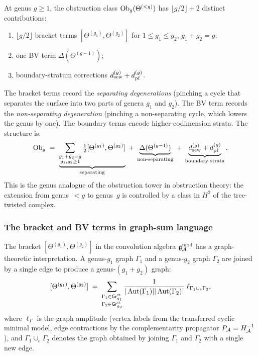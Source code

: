 \begin{remark}
\label{rem:thqg-VII-general-pattern}
At genus $g \geq 1$, the obstruction class
$\mathrm{Ob}_g(\Theta^{(<g)})$ has $\lfloor g/2 \rfloor + 2$ distinct
contributions:
\begin{enumerate}[label=(\alph*)]
\item $\lfloor g/2 \rfloor$ bracket terms
 $[\Theta^{(g_1)},\Theta^{(g_2)}]$ for $1 \leq g_1 \leq g_2$,
 $g_1 + g_2 = g$;
\item one BV term $\Delta(\Theta^{(g-1)})$;
\item boundary-stratum corrections $d_{\mathrm{sew}}^{(g)} + d_{\mathrm{pf}}^{(g)}$.
\end{enumerate}
The bracket terms record the \emph{separating degenerations}
(pinching a cycle that separates the surface into two parts of
genera $g_1$ and $g_2$). The BV term records the
\emph{non-separating degeneration} (pinching a non-separating
cycle, which lowers the genus by one). The boundary terms encode
higher-codimension strata. The structure is:
\begin{equation}\label{eq:thqg-VII-obs-general}
\mathrm{Ob}_g
\;=\;
\underbrace{
\sum_{\substack{g_1+g_2=g \\ g_1,g_2 \geq 1}}
\tfrac{1}{2}[\Theta^{(g_1)},\Theta^{(g_2)}]
}_{\text{separating}}
\;+\;
\underbrace{
\Delta(\Theta^{(g-1)})
}_{\text{non-separating}}
\;+\;
\underbrace{
d_{\mathrm{sew}}^{(g)} + d_{\mathrm{pf}}^{(g)}
}_{\text{boundary strata}}.
\end{equation}
This is the genus analogue of the obstruction tower in
obstruction theory: the extension from genus~$<g$ to genus~$g$
is controlled by a class in $H^2$ of the tree-twisted complex.
\end{remark}

\subsubsection{The bracket and BV terms in graph-sum language}
\label{subsubsec:thqg-VII-graph-sum}

The bracket $[\Theta^{(g_1)},\Theta^{(g_2)}]$ in the
convolution algebra $\mathfrak{g}_{\mathcal{A}}^{\mathrm{mod}}$ has a graph-theoretic interpretation.
A genus-$g_1$ graph $\Gamma_1$ and a genus-$g_2$ graph $\Gamma_2$
are joined by a single edge to produce a genus-$(g_1{+}g_2)$
graph:
\begin{equation}\label{eq:thqg-VII-bracket-graph}
[\Theta^{(g_1)},\Theta^{(g_2)}]
\;=\;
\sum_{\substack{\Gamma_1 \in \mathsf{Gr}_{g_1}^{\mathrm{st}}\\
 \Gamma_2 \in \mathsf{Gr}_{g_2}^{\mathrm{st}}}}
\frac{1}{|\operatorname{Aut}(\Gamma_1)||\operatorname{Aut}(\Gamma_2)|}
\;\ell_{\Gamma_1 \cup_e \Gamma_2},
\end{equation}
where $\ell_\Gamma$ is the graph amplitude
(vertex labels from the transferred cyclic minimal model, edge
contractions by the complementarity propagator
$P_{\mathcal{A}} = H_{\mathcal{A}}^{-1}$), and $\Gamma_1 \cup_e \Gamma_2$ denotes
the graph obtained by joining $\Gamma_1$ and $\Gamma_2$ with a
single new edge.

